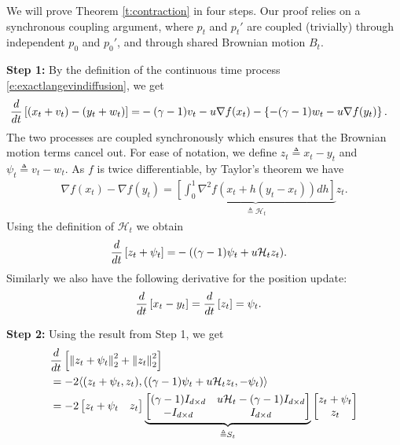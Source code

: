 \begin{Proof}
We will prove Theorem \ref{t:contraction} in four steps. Our proof relies on a synchronous coupling argument, where $p_t$ and $p_t'$ are coupled (trivially) through independent $p_0$ and $p_0'$, and through shared Brownian motion $B_t$.

\textbf{Step 1:}
By the definition of the continuous time process \eqref{e:exactlangevindiffusion}, we get
\begin{align*}
\frac{d}{d t} \left[(x_t+v_t) - (y_t+w_t)\right]
=& -(\gamma -1)v_t - u \nabla f(x_t) - \left \{-(\gamma -1)w_t - u \nabla f(y_t)\right \}.
\end{align*}
The two processes are coupled synchronously which ensures that the Brownian motion terms cancel out. For ease of notation, we define $z_t\triangleq x_t - y_t$ and $\psi_t\triangleq v_t - w_t$. As $f$ is twice differentiable, by Taylor's theorem we have 
\begin{align*}
\nabla f(x_t) - \nabla f(y_t) = \underbrace{\left[\int_0^1 \nabla^2 f(x_t+h(y_t-x_t))dh\right]}_{\triangleq\mathcal{H}_t}z_t. 
\end{align*}
Using the definition of $\mathcal{H}_t$ we obtain
\begin{align*}
\frac{d}{d t} \left[z_t+\psi_t\right] =& -( (\gamma -1) \psi_t + u \mathcal{H}_t z_t).
\end{align*}
Similarly we also have the following derivative for the position update:
\begin{align*}
\frac{d}{d t} \left[x_t - y_t\right] & = \frac{d}{d t} \left[z_t\right] = \psi_t.
\end{align*}

\textbf{Step 2:} Using the result from Step 1, we get
\begin{align}
\nonumber &\frac{d}{d t} \left[\left\| z_t+\psi_t\right\|_2^2 + \left\| z_t\right\|_2^2\right]  \\
\nonumber & =  -2\langle(z_t+\psi_t,z_t),((\gamma-1)\psi_t + u\mathcal{H}_t z_t,-\psi_t) \rangle\\
\label{e:contractimp}& = -2 \begin{bmatrix}
  z_t + \psi_t & z_t \\
 \end{bmatrix}\underbrace{\begin{bmatrix}
  (\gamma - 1) I_{d\times d} & u \mathcal{H}_t - (\gamma - 1)I_{d\times d} \\
  -I_{d\times d} & I_{d\times d}
 \end{bmatrix}}_{\triangleq S_t}\begin{bmatrix}
  z_t + \psi_t \\
  z_t 
 \end{bmatrix}
\end{align}


\end{Proof}
